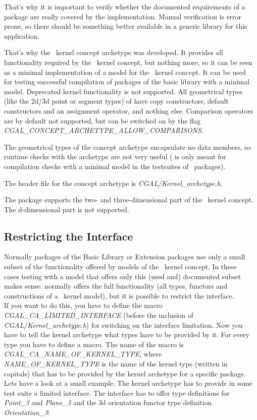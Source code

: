 That's why it is important to verify whether the documented requirements of a
package are really covered by the implementation. Manual verification is error
prone, so there should be something better available in a generic library for
this application.

That's why the \cgal\ kernel concept archetype  was
developed. It provides all functionality required by the \cgal\ kernel concept,
but nothing more, so it can be seen as a minimal implementation of a model for
the \cgal\ kernel concept.  It can be used for testing successful compilation of
packages of the basic library with a minimal model. Deprecated kernel
functionality is not supported. All geometrical types (like the 2d/3d point or
segment types) of  have copy constructors, default
constructors and an assignment operator, and nothing else.  Comparison
operators are by default not supported, but can be switched on by the flag {\em
CGAL\_CONCEPT\_ARCHETYPE\_ALLOW\_COMPARISONS}.

The geometrical types of the concept archetype encapsulate no data members, so
runtime checks with the archetype are not very useful
( is only meant for compilation checks with a
minimal model in the testsuites of \cgal\ packages).

The header file for the concept archetype is {\em CGAL/Kernel\_archetype.h}.

The package supports the two- and three-dimensional part of the \cgal\ kernel
concept. The d-dimensional part is not supported.

\subsection{Restricting the Interface}

Normally packages of the Basic Library or Extension packages use only a small
subset of the functionality offered by models of the \cgal\ kernel concept. In
these cases testing with a model that offers only this (used and) documented
subset makes sense.  normally offers the full
functionality (all types, functors and constructions of a \cgal\ kernel model),
but it is possible to restrict the interface.\\ If you want to do this, you
have to define the macro {\em CGAL\_CA\_LIMITED\_INTERFACE} (before the
inclusion of {\em CGAL/Kernel\_archetype.h}) for switching on the interface
limitation. Now you have to tell the kernel archetype what types have to be
provided by it. For every type you have to define a macro.  The name of the
macro is {\em CGAL\_CA\_NAME\_OF\_KERNEL\_TYPE}, where {\em
NAME\_OF\_KERNEL\_TYPE} is the name of the kernel type (written in capitals)
that has to be provided by the kernel archetype for a specific package.  Lets
have a look at a small example. The kernel archetype has to provide in some
test suite a limited interface.  The interface has to offer type definitions
for {\em Point\_3} and {\em Plane\_3} and the 3d orientation functor type
definition {\em Orientation\_3}:

